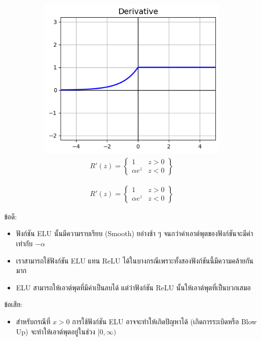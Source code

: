 \begin{itemize}
\begin{figure}[H]
\begin{subfigure}{0.5\textwidth}
                  \includegraphics[width=0.9\linewidth]{fig/actfunc_elu_der.png}
                  \caption{%
                      \begin{equation}
                          \begin{split}R'(z) =
                              \begin{Bmatrix}
                                  1          & z>0 \\
                                  \alpha e^z & z<0
                              \end{Bmatrix}
                          \end{split}
                      \end{equation}
                  }
                  \label{fig:actfunc_elu_der}
              \end{subfigure}
          \end{figure}
          ข้อดี:
          \begin{itemize}
              \item ฟังก์ชัน ELU นั้นมีความราบเรียบ (Smooth) ยอ่างช้า ๆ จนกว่าค่าเอาต์พุตของฟังก์ชันจะมีค่าเท่ากับ $-\alpha$

              \item เราสามารถใช้ฟังก์ชัน ELU แทน ReLU ได้ในบางกรณีเพราะทั้งสองฟังก์ชันนี้มีความคล้ายกันมาก

              \item ELU สามารถให้เอาต์พุตที่มีค่าเป็นลบได้ แต่ว่าฟังก์ชัน ReLU นั้นให้เอาต์พุตที่เป็นบวกเสมอ
          \end{itemize}
          ข้อเสีย:
          \begin{itemize}
              \item สำหรับกรณีที่ $x > 0$ การใช้ฟังก์ชัน ELU อาจจะทำให้เกิดปัญหาได้ (เกิดการระเบิดหรือ Blow Up) จะทำให้เอาต์พุตอยู่ในช่วง
                    $[0,\infty)$
          \end{itemize}


\end{itemize}
